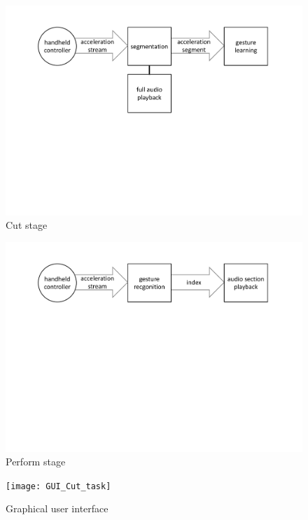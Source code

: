 \documentclass{nime-alternate_ADJ} %
\begin{document}
\begin{figure}[t!]
	\centering
		\includegraphics[trim={3.2cm 10.2cm 3.2cm 2.1cm}, clip=true, width=1\columnwidth]{cut}
	\caption{Cut stage}
	\label{fig_3}
\end{figure}

\begin{figure}[t!]
	\centering
		\includegraphics[trim={3.2cm 14.9cm 3.2cm 2.1cm}, clip=true, width=1\columnwidth]{perform}
	\caption{Perform stage}
	\label{fig_4}
\end{figure}

\begin{figure}[t!]
	\centering
		\texttt{[image: GUI\_Cut\_task]}
\caption{Graphical user interface}
	\label{fig_5}
\end{figure}
\end{document}
